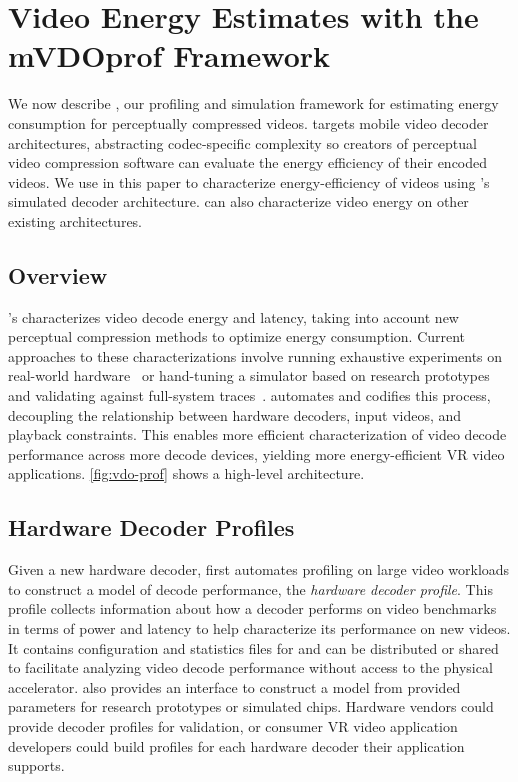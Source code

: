 \section{Video Energy Estimates with the {mVDOprof} Framework}
\label{sec:vdoprof}

We now describe \nameArchprof, our profiling and simulation framework for estimating energy consumption for perceptually compressed videos.
\nameArchprof targets mobile video decoder architectures, abstracting codec-specific complexity so creators of perceptual video compression software can evaluate the energy efficiency of their encoded videos.
We use \nameArchprof in this paper to characterize energy-efficiency of videos using \nameArch's simulated decoder architecture. \nameArchprof can also characterize video energy on other existing architectures.


\subsection{\nameArchprof Overview}
\nameArchprof's characterizes video decode energy and latency, taking into account new perceptual compression methods to optimize energy consumption.
Current approaches to these characterizations involve running exhaustive experiments on real-world hardware~\cite{evr19isca} or hand-tuning a simulator based on research prototypes and validating against full-system traces~\cite{zhang2017race}.
\nameArchprof automates and codifies this process, decoupling the relationship between hardware decoders, input videos, and playback constraints.
This enables more efficient characterization of video decode performance across more decode devices, yielding more energy-efficient VR video applications.
\ref{fig:vdo-prof} shows a high-level \nameArchprof architecture.

\vdoprofOverview

\subsection{Hardware Decoder Profiles}
\label{subsec:profiles}

Given a new hardware decoder, \nameArchprof first automates profiling on large video workloads to construct a model of decode performance, the \emph{hardware decoder profile}.
This profile collects information about how a decoder performs on video benchmarks in terms of power and latency to help characterize its performance on new videos.
It contains configuration and statistics files for \nameArchprof and can be distributed or shared to facilitate analyzing video decode performance without access to the physical accelerator.
\nameArchprof also provides an interface to construct a model from provided parameters for research prototypes or simulated chips.
Hardware vendors could provide \nameArchprof decoder profiles for validation, or consumer VR video application developers could build profiles for each hardware decoder their application supports.


